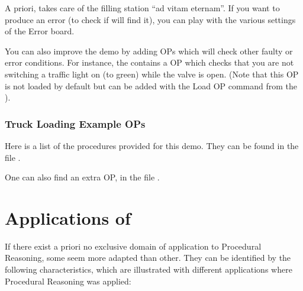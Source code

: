 A priori, \CPK{} takes care of the filling station ``ad vitam eternam''. If you
want to produce an error (to check if \COPRS will find it), you can play with
the various settings of the Error board.

You can also improve the demo by adding OPs which will check other faulty or
error conditions. For instance, the 
contains a OP which checks that you are not switching a traffic light on (to
green) while the valve is open. (Note that this OP is not loaded by default but
can be added with the Load OP command from the \XPK{}).

\subsection{Truck Loading Example OPs}

Here is a list of the procedures provided for this demo. They can be found in
the file .



One can also find an extra OP, in the file .



\chapter{Applications of \COPRS{}}

If there exist a priori no exclusive domain of application to Procedural
Reasoning, some seem more adapted than other. They can be identified by
the following characteristics, which are illustrated with different
applications where Procedural Reasoning was applied:

